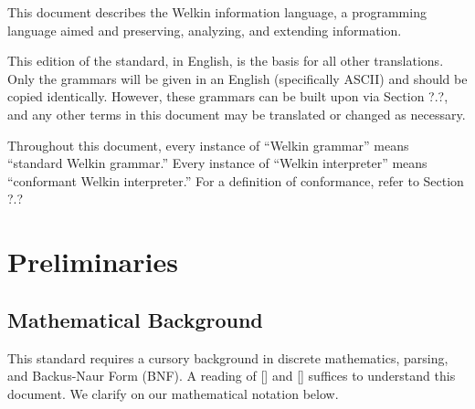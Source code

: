 

This document describes the Welkin information language, a programming language aimed and preserving, analyzing, and extending information.


This edition of the standard, in English, is the basis for all other translations. Only the grammars will be given in an English (specifically ASCII) and should be copied identically. However, these grammars can be built upon via Section ?.?, and any other terms in this document may be translated or changed as necessary.

Throughout this document, every instance of ``Welkin grammar'' means ``standard Welkin grammar.'' Every instance of ``Welkin interpreter'' means ``conformant Welkin interpreter.'' For a definition of conformance, refer to Section ?.?

\section{Preliminaries}

\newcommand*{\chars}{\mathrm{CHAR}}
\newcommand*{\numbers}{\mathrm{NUMBERS}}
\newcommand*{\whitespaces}{\mathrm{WHITE\_SPACES}}
\newcommand*{\reserved}{\mathrm{RESERVED}}
\newcommand*{\strings}{\mathrm{STRING}}
\newcommand*{\term}{\mathrm{term}}
\newcommand*{\terms}{\mathrm{terms}}
\newcommand*{\delimiters}{\mathrm{DELIMITERS}}
\newcommand*{\escapes}{\mathrm{STRING\_ESCAPES}}
\newcommand*{\encoding}{\mathcal{E}}
\newcommand*{\decoding}{\mathcal{D}}
\newcommand*{\can}{\textrm{Can}}


\newcommand*{\scope}{\textrm{scope}}

\subsection{Mathematical Background}
This standard requires a cursory background in discrete mathematics, parsing, and Backus-Naur Form (BNF). A reading of [] and [] suffices to understand this document. We clarify on our mathematical notation below.

